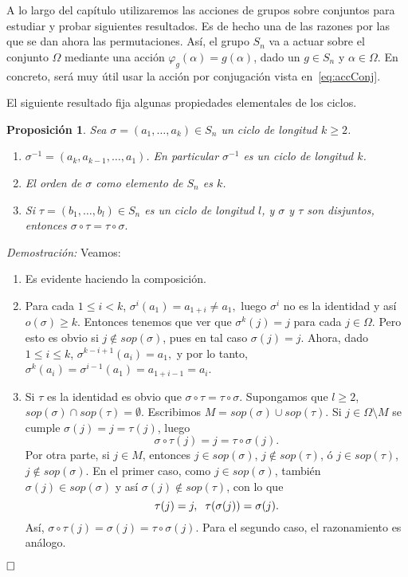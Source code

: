 \documentclass[12pt]{article}
\newtheorem{proposition}[theorem]{Proposición}
\begin{document}
A lo largo del capítulo utilizaremos las acciones de grupos sobre conjuntos para estudiar y probar siguientes resultados. Es de hecho una de las razones por las que se dan ahora las permutaciones. Así, el grupo $S_{n}$ va a actuar sobre el conjunto $\Omega$ mediante una acción  $\varphi_{g}(\alpha)=g(\alpha)$, dado un $g \in S_{n}$ y $\alpha \in \Omega$.
En concreto, será muy útil usar la acción por conjugación vista en~\ref{eq:accConj}.

El siguiente resultado fija algunas propiedades elementales de los ciclos.
\begin{proposition}\label{eq:asimet} Sea $\sigma = (a_{1}, \ldots, a_{k}) \in S_{n}$ un ciclo de longitud $k \geq 2$. \begin{enumerate}
\item $\sigma^{-1} = (a_{k}, a_{k-1}, \ldots, a_{1})$. En particular $\sigma^{-1}$ es un ciclo de longitud $k$.
\item El orden de $\sigma$ como elemento de $S_{n}$ es $k$.
\item Si $\tau = (b_{1}, \ldots, b_{l}) \in S_{n}$ es un ciclo de longitud $l$, y $\sigma$ y $\tau$ son disjuntos, entonces $\sigma \circ \tau = \tau \circ \sigma.$
\end{enumerate}
\end{proposition}
\emph{Demostración: }Veamos:\begin{enumerate}

\item Es evidente haciendo la composición.

\item Para cada $1 \leq i < k$, $\sigma^{i}(a_{1}) = a_{1+i} \neq a_{1},$ luego $\sigma^{i}$ no es la identidad y así $o(\sigma) \geq k.$ Entonces tenemos que ver que $\sigma^{k}(j) = j$ para cada $j \in \Omega$. Pero esto es obvio si $j \notin sop(\sigma)$, pues en tal caso $\sigma(j) = j$. Ahora, dado $1 \leq i \leq k$, $\sigma^{k-i+1}(a_{i}) = a_{1},$ y por lo tanto, $\sigma^{k}(a_{i}) = \sigma^{i-1}(a_{1}) = a_{1+i-1} = a_{i}$.

\item Si $\tau$ es la identidad es obvio que $\sigma \circ \tau = \tau \circ \sigma$. Supongamos que $l \geq 2$, $sop(\sigma) \cap sop(\tau) = \emptyset$. Escribimos $M = sop(\sigma) \cup sop(\tau)$. Si $j \in \Omega \setminus M$ se cumple $\sigma(j) = j = \tau(j)$, luego $$\sigma \circ \tau(j) = j = \tau \circ \sigma(j).$$
Por otra parte, si $j \in M$, entonces $j \in sop(\sigma)$, $j \notin sop(\tau)$, ó $j \in sop(\tau)$, $j \notin sop(\sigma).$ En el primer caso, como $j \in sop(\sigma)$, también $\sigma(j) \in sop(\sigma)$ y así $\sigma(j) \notin sop(\tau)$, con lo que $$\tau(j) = j , \hspace{0.2cm} \tau(\sigma(j)) = \sigma(j).$$ Así, $\sigma \circ \tau(j) = \sigma(j) = \tau \circ \sigma(j).$ Para el segundo caso, el razonamiento es análogo.
\end{enumerate}
$\hfill \square$
\end{document}
